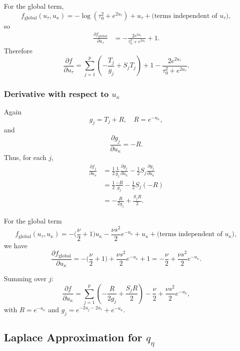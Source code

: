 \documentclass[11pt]{article}
\begin{document}
For the global term,
\[
  f_{\mathrm{global}}(u_\tau,u_\kappa)
  = -\log(\tau_0^2 + e^{2u_\tau})
    + u_\tau + \text{(terms independent of $u_\tau$)},
\]
so
\begin{align}
  \frac{\partial f_{\mathrm{global}}}{\partial u_\tau}
  &= -\frac{2 e^{2u_\tau}}{\tau_0^2 + e^{2u_\tau}} + 1.
\end{align}
Therefore
\begin{equation}
  \boxed{
  \frac{\partial f}{\partial u_\tau}
  = \sum_{j=1}^p \left(-\frac{T_j}{g_j} + S_j T_j\right)
    + 1 - \frac{2 e^{2u_\tau}}{\tau_0^2 + e^{2u_\tau}}.
  }
\end{equation}

\subsubsection*{Derivative with respect to $u_\kappa$}

Again
\[
  g_j = T_j + R, \quad R = e^{-u_\kappa},
\]
and
\[
  \frac{\partial g_j}{\partial u_\kappa}
  = -R.
\]
Thus, for each $j$,
\begin{align}
  \frac{\partial f_j}{\partial u_\kappa}
  &= \frac12 \frac{1}{g_j}\frac{\partial g_j}{\partial u_\kappa}
     - \frac12 S_j \frac{\partial g_j}{\partial u_\kappa} \\
  &= \frac12 \frac{-R}{g_j}
     - \frac12 S_j (-R) \\
  &= -\frac{R}{2g_j} + \frac{S_j R}{2}.
\end{align}

For the global term
\[
  f_{\mathrm{global}}(u_\tau,u_\kappa)
  = -\Big(\frac{\nu}{2}+1\Big)u_\kappa
    -\frac{\nu s^2}{2}e^{-u_\kappa}
    + u_\kappa + \text{(terms independent of $u_\kappa$)},
\]
we have
\begin{equation}
  \frac{\partial f_{\mathrm{global}}}{\partial u_\kappa}
  = -\Big(\frac{\nu}{2}+1\Big)
    + \frac{\nu s^2}{2}e^{-u_\kappa}
    + 1
  = -\frac{\nu}{2} + \frac{\nu s^2}{2}e^{-u_\kappa}.
\end{equation}

Summing over $j$:
\begin{equation}
  \boxed{
  \frac{\partial f}{\partial u_\kappa}
  = \sum_{j=1}^p\left(
      -\frac{R}{2g_j} + \frac{S_j R}{2}
    \right)
    -\frac{\nu}{2}
    + \frac{\nu s^2}{2}e^{-u_\kappa},
  }
\end{equation}
with $R = e^{-u_\kappa}$ and $g_j = e^{-2u_j-2u_\tau} + e^{-u_\kappa}$.

\subsection{Laplace Approximation for $q_\eta$}
\end{document}
